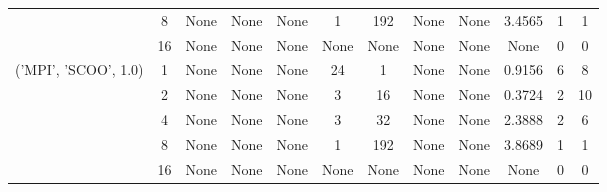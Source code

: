 \begin{tabular}{cccccccccccc}
& 8& None& None& None& 1& 192& None& None& 3.4565& 1& 1\\
& 16& None& None& None& None& None& None& None& None& 0& 0\\
\hline
\multirow{5}{*}{('MPI', 'SCOO', 1.0)}& 1& None& None& None& 24& 1& None& None& 0.9156& 6& 8\\
& 2& None& None& None& 3& 16& None& None& 0.3724& 2& 10\\
& 4& None& None& None& 3& 32& None& None& 2.3888& 2& 6\\
& 8& None& None& None& 1& 192& None& None& 3.8689& 1& 1\\
& 16& None& None& None& None& None& None& None& None& 0& 0\\
\hline
\end{tabular}



